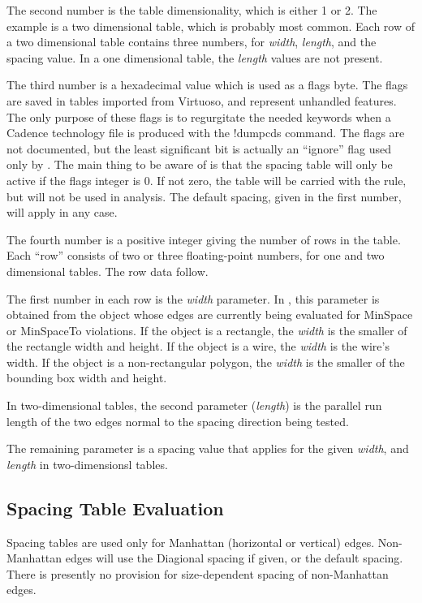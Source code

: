 The second number is the table dimensionality, which is either 1 or 2. 
The example is a two dimensional table, which is probably most common. 
Each row of a two dimensional table contains three numbers, for {\it
width\/}, {\it length\/}, and the spacing value.  In a one dimensional
table, the {\it length} values are not present.

The third number is a hexadecimal value which is used as a flags byte. 
The flags are saved in tables imported from Virtuoso, and represent
unhandled features.  The only purpose of these flags is to regurgitate
the needed keywords when a Cadence technology file is produced with
the {\cb !dumpcds} command.  The flags are not documented, but the
least significant bit is actually an ``ignore'' flag used only by
{\Xic}.  The main thing to be aware of is that the spacing table will
only be active if the flags integer is 0.  If not zero, the table will
be carried with the rule, but will not be used in analysis.  The
default spacing, given in the first number, will apply in any case.

The fourth number is a positive integer giving the number of rows in
the table.  Each ``row'' consists of two or three floating-point
numbers, for one and two dimensional tables.  The row data follow.

The first number in each row is the {\it width} parameter.  In {\Xic},
this parameter is obtained from the object whose edges are currently
being evaluated for {\et MinSpace} or {\et MinSpaceTo} violations.  If
the object is a rectangle, the {\it width} is the smaller of the
rectangle width and height.  If the object is a wire, the {\it width}
is the wire's width.  If the object is a non-rectangular polygon, the
{\it width} is the smaller of the bounding box width and height.

In two-dimensional tables, the second parameter ({\it length\/}) is
the parallel run length of the two edges normal to the spacing
direction being tested.

The remaining parameter is a spacing value that applies for the given
{\it width\/}, and {\it length} in two-dimensionsl tables.

\subsection{Spacing Table Evaluation}

Spacing tables are used only for Manhattan (horizontal or vertical)
edges.  Non-Manhattan edges will use the {\et Diagional} spacing if
given, or the default spacing.  There is presently no provision for
size-dependent spacing of non-Manhattan edges.

